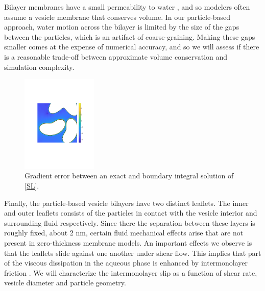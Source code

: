 Bilayer membranes have a small permeability to water \cite{323e9a2f0c58487ea82518d7a1f96485},
and so modelers often assume a vesicle membrane that conserves volume. In our particle-based approach, water motion across
the bilayer is limited by the size of the gaps between the particles, which is an artifact of coarse-graining.
Making these gaps smaller comes at the expense of numerical accuracy, and so we will assess if there is a reasonable trade-off
between approximate volume conservation and simulation complexity. 

\begin{figure}
\centerline{\includegraphics[width=0.32\textwidth]{figures/BIError.pdf}}
\caption{
\label{fig:bierror}  
  Gradient error between an exact and boundary integral solution of \eqref{SL}.
}
\end{figure}

Finally, the particle-based vesicle bilayers have two distinct leaflets.
The inner and outer leaflets consists of the particles in contact with the vesicle interior and 
surrounding fluid respectively. Since there the separation between these layers is roughly fixed,
about 2 nm, certain fluid mechanical effects arise that are not present in zero-thickness membrane models. 
An important effects we observe is that the leaflets slide against one another under shear flow. 
This implies that part of the viscous dissipation in the aqueous phase is enhanced by intermonolayer friction
\cite{SHKULIPA2005823, ShkulipaThesis}. We will characterize the intermonolayer
slip as a function of shear rate, vesicle diameter and particle geometry. 


